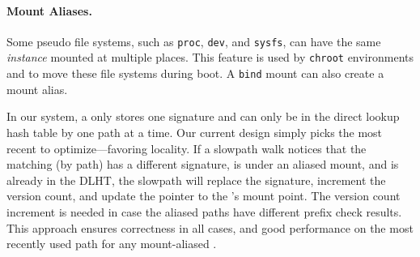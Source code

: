 


\paragraph{Mount Aliases.}
Some pseudo file systems, such as {\tt proc}, {\tt dev}, and {\tt sysfs},
can have the same {\em instance} mounted at multiple places.
This feature is used by {\tt chroot} environments and to 
move these file systems during boot.
A {\tt bind} mount can also create a mount alias.

In our system, a \dentry{} only stores one signature and can only be in the direct lookup hash table
by one path at a time.  
Our current design simply picks the most recent to optimize---favoring locality.
If a slowpath walk notices that the matching \dentry{} (by path) has a different signature,
is under an aliased mount, and is already in the DLHT, the slowpath will replace the signature,
increment the \dentry{} version count, and
update the pointer to the \dentry{}'s mount point.
The version count increment is needed in case the aliased paths
have different prefix check results.
This approach ensures correctness in all cases, and good performance on the most recently used path for any mount-aliased \dentry{}.


